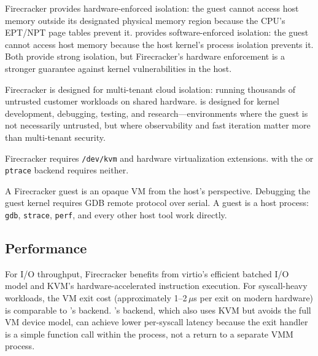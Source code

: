 \begin{description}[style=nextline,leftmargin=2em]
  \item[Isolation model.]
    Firecracker provides hardware-enforced isolation: the guest cannot
    access host memory outside its designated physical memory region
    because the CPU's EPT/NPT page tables prevent it.  \UML{} provides
    software-enforced isolation: the guest cannot access host memory
    because the host kernel's process isolation prevents it.  Both
    provide strong isolation, but Firecracker's hardware enforcement
    is a stronger guarantee against kernel vulnerabilities in the host.

  \item[Use case.]
    Firecracker is designed for multi-tenant cloud isolation: running
    thousands of untrusted customer workloads on shared hardware.
    \UML{} is designed for kernel development, debugging, testing,
    and research---environments where the guest is not necessarily
    untrusted, but where observability and fast iteration matter more
    than multi-tenant security.

  \item[Hardware requirements.]
    Firecracker requires \texttt{/dev/kvm} and hardware virtualization
    extensions.  \UML{} with the \Seccomp{} or \texttt{ptrace} backend
    requires neither.

  \item[Host tool access.]
    A Firecracker guest is an opaque VM from the host's perspective.
    Debugging the guest kernel requires GDB remote protocol over serial.
    A \UML{} guest is a host process: \texttt{gdb}, \texttt{strace},
    \texttt{perf}, and every other host tool work directly.
\end{description}

\subsection{Performance}

For I/O throughput, Firecracker benefits from virtio's efficient
batched I/O model and KVM's hardware-accelerated instruction
execution.  For syscall-heavy workloads, the VM exit cost
(approximately 1--2\,$\mu$s per exit on modern hardware) is
comparable to \UML{}'s \Seccomp{} backend.  \UML{}'s \KVMvTwo{}
backend, which also uses KVM but avoids the full VM device model,
can achieve lower per-syscall latency because the exit handler is a
simple function call within the \UML{} process, not a return to
a separate VMM process.


